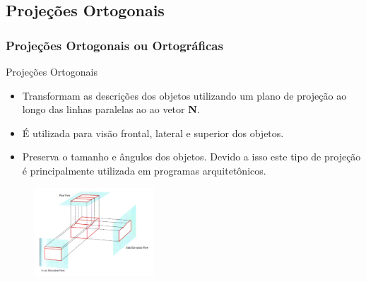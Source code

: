 \documentclass{beamer}
\begin{document}
\subsection{Projeções Ortogonais}
\begin{frame}
\frametitle{Projeções Ortogonais ou Ortográficas}
	\begin{block}{Projeções Ortogonais}
		\begin{itemize}
			\item Transformam as descrições dos objetos utilizando um plano de projeção ao longo das linhas paralelas ao ao vetor \textbf{N}.
			\item É utilizada para visão frontal, lateral e superior dos objetos.
			\item Preserva o tamanho e ângulos dos objetos. Devido a isso este tipo de projeção é principalmente utilizada em programas arquitetônicos.
		\end{itemize}
	\end{block}
	
	\begin{figure}[!h]
			\begin{center}
			\includegraphics[width=0.4\textwidth]{Figures/ProjOrt}
			\end{center}
	\end{figure}
\end{frame}
\end{document}
